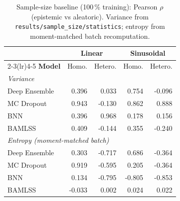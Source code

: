 
\begin{table}[htbp]
\centering
\small
\caption{Sample-size baseline (100\,\% training): Pearson $\rho$ (epistemic vs aleatoric). Variance from \texttt{results/sample\_size/statistics}; entropy from moment-matched batch recomputation.}
\begin{tabular}{l r r r r}
\toprule
& \multicolumn{2}{c}{Linear} & \multicolumn{2}{c}{Sinusoidal} \\
\cmidrule(lr){2-3}\cmidrule(lr){4-5}
\textbf{Model} & Homo. & Hetero. & Homo. & Hetero. \\
\midrule
\multicolumn{5}{l}{\textit{Variance}} \\
Deep Ensemble & 0.396 & 0.033 & 0.754 & -0.096 \\
MC Dropout & 0.943 & -0.130 & 0.862 & 0.888 \\
BNN & 0.396 & 0.968 & 0.178 & 0.156 \\
BAMLSS & 0.409 & -0.144 & 0.355 & -0.240 \\
\midrule
\multicolumn{5}{l}{\textit{Entropy (moment-matched batch)}} \\
Deep Ensemble & 0.303 & -0.717 & 0.686 & -0.364 \\
MC Dropout & 0.919 & -0.595 & 0.205 & -0.364 \\
BNN & 0.134 & -0.795 & -0.805 & -0.853 \\
BAMLSS & -0.033 & 0.002 & 0.024 & 0.022 \\
\bottomrule
\end{tabular}
\end{table}

